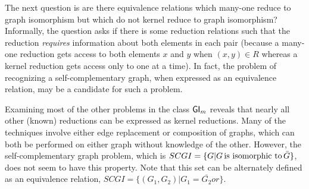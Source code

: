 The next question is are there equivalence relations which many-one reduce to
graph isomorphism but which do not kernel reduce to graph isomorphism?
Informally, the question asks if there is some reduction relations such that
the reduction \emph{requires} information about both elements in each pair
(because a many-one reduction gets access to both elements $x$ and $y$ when
$(x,y)\in R$ whereas a kernel reduction gets access only to one at a time). In
fact, the problem of recognizing a self-complementary graph, when expressed as
an equivalence relation, may be a candidate for such a problem.

Examining most of the other problems in the class ${\mathsf{GI}}_m$ reveals that nearly
all other (known) reductions can be expressed as kernel reductions. Many of the
techniques involve either edge replacement or composition of graphs, which can
both be performed on either graph without knowledge of the other. However, the
self-complementary graph problem, which is $SCGI=\{G|G \,\text{is isomorphic to}\,
\bar{G}\}$, does not seem to have this property. Note that this set can be
alternately defined as an equivalence relation, $SCGI=\{(G_1,
G_2)|G_1=\bar{G_2} or \}$.
